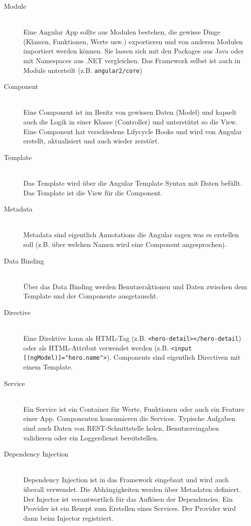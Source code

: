 \begin{description}
	\item[Module] \hfil \\
	Eine Angular App sollte aus Modulen bestehen, die gewisse Dinge (Klassen, Funktionen, Werte usw.) exportieren und von anderen Modulen importiert werden können. Sie lassen sich mit den Packages aus Java oder mit Namespaces aus .NET vergleichen. Das Framework selbst ist auch in Module unterteilt (z.B. \lstinline|angular2/core|)
	\item[Component] \hfil \\
	Eine Component ist im Besitz von gewissen Daten (Model) und kapselt auch die Logik in einer Klasse (Controller) und unterstützt so die View. Eine Component hat verschiedene Lifycycle Hooks und wird von Angular erstellt, aktualisiert und auch wieder zerstört.
	\item[Template] \hfil \\
	Das Template wird über die Angular Template Syntax mit Daten befüllt. Das Template ist die View für die Component.
	\item[Metadata] \hfil \\
	Metadata sind eigentlich Annotations die Angular sagen was es erstellen soll (z.B. über welchen Namen wird eine Component angesprochen).
	\item[Data Binding] \hfil \\
	Über das Data Binding werden Benutzeraktionen und Daten zwischen dem Template und der Componente ausgetauscht. 
	\item[Directive] \hfil \\
	Eine Direktive kann als HTML-Tag (z.B. \lstinline|<hero-detail></hero-detail|) oder als HTML-Attribut verwendet werden (z.B. \lstinline|<input [(ngModel)]="hero.name">|). Components sind eigentlich Directiven mit einem Template.
	\item[Service] \hfil \\
	Ein Service ist ein Container für Werte, Funktionen oder auch ein Feature einer App. Componenten konsumieren die Services. Typische Aufgaben sind auch Daten von REST-Schnittstelle holen, Benutzereingaben validieren oder ein Loggerdienst bereitstellen.
	\item[Dependency Injection] \hfil \\
	Dependency Injection ist in das Framework eingebaut und wird auch überall verwendet. Die Abhängigkeiten werden über Metadaten definiert. Der Injector ist verantwortlich für das Auflösen der Dependencies. Ein Provider ist ein Rezept zum Erstellen eines Services. Der Provider wird dann beim Injector registriert.
\end{description}
